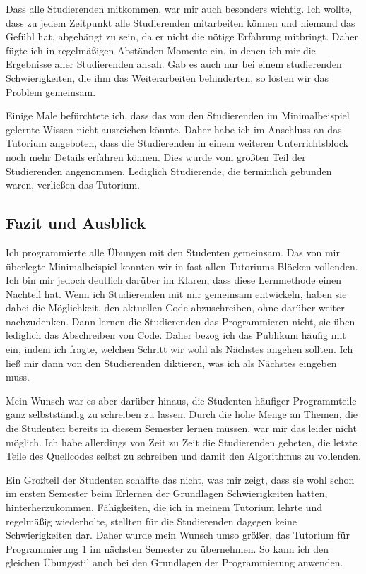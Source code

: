 Dass alle Studierenden mitkommen, war mir auch besonders wichtig. Ich wollte, dass zu jedem Zeitpunkt alle Studierenden mitarbeiten können und niemand das Gefühl hat, abgehängt zu sein, da er nicht die nötige Erfahrung mitbringt. Daher fügte ich in regelmäßigen Abständen Momente ein, in denen ich mir die Ergebnisse aller Studierenden ansah. Gab es auch nur bei einem studierenden Schwierigkeiten, die ihm das Weiterarbeiten behinderten, so lösten wir das Problem gemeinsam.

Einige Male befürchtete ich, dass das von den Studierenden im Minimalbeispiel gelernte Wissen nicht ausreichen könnte. Daher habe ich im Anschluss an das Tutorium angeboten, dass die Studierenden in einem weiteren Unterrichtsblock noch mehr Details erfahren können. Dies wurde vom größten Teil der Studierenden angenommen. Lediglich Studierende, die terminlich gebunden waren, verließen das Tutorium.

\subsection{Fazit und Ausblick}

Ich programmierte alle Übungen mit den Studenten gemeinsam. Das von mir überlegte Minimalbeispiel konnten wir in fast allen Tutoriums Blöcken vollenden. Ich bin mir jedoch deutlich darüber im Klaren, dass diese Lernmethode einen Nachteil hat. Wenn ich Studierenden mit mir gemeinsam entwickeln, haben sie dabei die Möglichkeit, den aktuellen Code abzuschreiben, ohne darüber weiter nachzudenken. Dann lernen die Studierenden das Programmieren nicht, sie üben lediglich das Abschreiben von Code.
Daher bezog ich das Publikum häufig mit ein, indem ich fragte, welchen Schritt wir wohl als Nächstes angehen sollten. Ich ließ mir dann von den Studierenden diktieren, was ich als Nächstes eingeben muss. 

Mein Wunsch war es aber darüber hinaus, die Studenten häufiger Programmteile ganz selbstständig zu schreiben zu lassen. Durch die hohe Menge an Themen, die die Studenten bereits in diesem Semester lernen müssen, war mir das leider nicht möglich. 
Ich habe allerdings von Zeit zu Zeit die Studierenden gebeten, die letzte Teile des Quellcodes selbst zu schreiben und damit den Algorithmus zu vollenden.
 
Ein Großteil der Studenten schaffte das nicht, was mir zeigt, dass sie wohl schon im ersten Semester beim Erlernen der Grundlagen Schwierigkeiten hatten, hinterherzukommen. Fähigkeiten, die ich in meinem Tutorium lehrte und regelmäßig wiederholte, stellten für die Studierenden dagegen keine Schwierigkeiten dar. Daher wurde mein Wunsch umso größer, das Tutorium für Programmierung 1 im nächsten Semester zu übernehmen. So kann ich den gleichen Übungsstil auch bei den Grundlagen der Programmierung anwenden.


